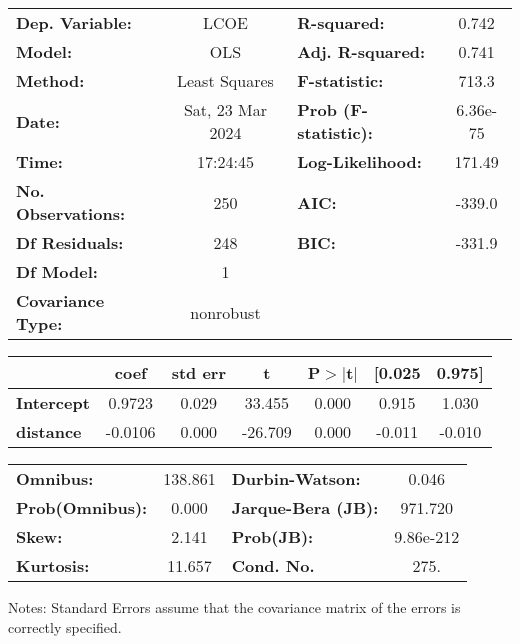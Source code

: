 \begin{center}
\begin{tabular}{lclc}
\toprule
\textbf{Dep. Variable:}    &       LCOE       & \textbf{  R-squared:         } &     0.742   \\
\textbf{Model:}            &       OLS        & \textbf{  Adj. R-squared:    } &     0.741   \\
\textbf{Method:}           &  Least Squares   & \textbf{  F-statistic:       } &     713.3   \\
\textbf{Date:}             & Sat, 23 Mar 2024 & \textbf{  Prob (F-statistic):} &  6.36e-75   \\
\textbf{Time:}             &     17:24:45     & \textbf{  Log-Likelihood:    } &    171.49   \\
\textbf{No. Observations:} &         250      & \textbf{  AIC:               } &    -339.0   \\
\textbf{Df Residuals:}     &         248      & \textbf{  BIC:               } &    -331.9   \\
\textbf{Df Model:}         &           1      & \textbf{                     } &             \\
\textbf{Covariance Type:}  &    nonrobust     & \textbf{                     } &             \\
\bottomrule
\end{tabular}
\begin{tabular}{lcccccc}
                   & \textbf{coef} & \textbf{std err} & \textbf{t} & \textbf{P$> |$t$|$} & \textbf{[0.025} & \textbf{0.975]}  \\
\midrule
\textbf{Intercept} &       0.9723  &        0.029     &    33.455  &         0.000        &        0.915    &        1.030     \\
\textbf{distance}  &      -0.0106  &        0.000     &   -26.709  &         0.000        &       -0.011    &       -0.010     \\
\bottomrule
\end{tabular}
\begin{tabular}{lclc}
\textbf{Omnibus:}       & 138.861 & \textbf{  Durbin-Watson:     } &     0.046  \\
\textbf{Prob(Omnibus):} &   0.000 & \textbf{  Jarque-Bera (JB):  } &   971.720  \\
\textbf{Skew:}          &   2.141 & \textbf{  Prob(JB):          } & 9.86e-212  \\
\textbf{Kurtosis:}      &  11.657 & \textbf{  Cond. No.          } &      275.  \\
\bottomrule
\end{tabular}
\end{center}

Notes: \newline
 [1] Standard Errors assume that the covariance matrix of the errors is correctly specified.